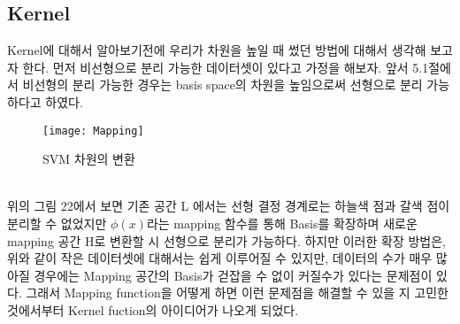 \documentclass[a4paper]{oblivoir}
\begin{document}
\subsection{Kernel}
\indent Kernel에 대해서 알아보기전에 우리가 차원을 높일 때 썼던 방법에 대해서 생각해 보고자 한다. 먼저 비선형으로 분리 가능한 데이터셋이 있다고 가정을 해보자. 앞서 5.1절에서 비선형의 분리 가능한 경우는 basis space의 차원을 높임으로써 선형으로 분리 가능하다고 하였다.
\begin{figure}[ht]\centering
\texttt{[image: Mapping]}\caption{SVM 차원의 변환}\label{Fig:5-22}
\end{figure}\\
\indent 위의 그림 22에서 보면 기존 공간 L 에서는 선형 결정 경계로는 하늘색 점과 갈색 점이 분리할 수 없었지만 $\phi(x)$라는 mapping 함수를 통해 Basis를 확장하며 새로운 mapping 공간 H로 변환할 시 선형으로 분리가 가능하다. 하지만 이러한 확장 방법은, 위와 같이 작은 데이터셋에 대해서는 쉽게 이루어질 수 있지만, 데이터의 수가 매우 많아질 경우에는 Mapping 공간의 Basis가 걷잡을 수 없이 커질수가 있다는 문제점이 있다. 그래서 Mapping function을 어떻게 하면 이런 문제점을 해결할 수 있을 지 고민한 것에서부터 Kernel fuction의 아이디어가 나오게 되었다.
\end{document}
